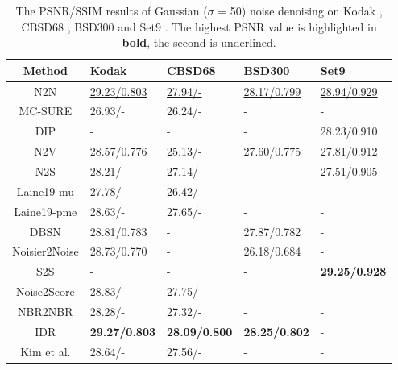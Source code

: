 \documentclass[conference]{IEEEtran}
\begin{document}
\begin{table}[t]
	\setlength{\abovecaptionskip}{0pt}
	\setlength{\belowcaptionskip}{0pt}
	\caption{The PSNR/SSIM results of Gaussian ($\sigma$ = 50) noise denoising on Kodak \cite{franzen1999kodak}, CBSD68 \cite{roth2005fields}, BSD300 \cite{martin2001database} and Set9 \cite{ulyanov2018deep}. The highest PSNR value is highlighted in \textbf {bold}, the second is \underline{underlined}.}
	\centering
	\begin{tabular*}{\hsize}{c@{\extracolsep{\fill}}l@{\extracolsep{\fill}}l@{\extracolsep{\fill}}l@{\extracolsep{\fill}}l@{\extracolsep{\fill}}}
		\hline
		Method	&Kodak&	CBSD68&	BSD300&	Set9\\
		\hline
		N2N \cite{lehtinen2018noise2noise}	&\underline{29.23/0.803}&	\underline{27.94/-}&	\underline{28.17/0.799}&	\underline{28.94/0.929}\\
		MC-SURE\cite{ramani2008monte}	&26.93/-&	26.24/-&	-&	-\\
		DIP \cite{ulyanov2018deep}&	-&	-&	-	&28.23/0.910\\
		N2V \cite{krull2019noise2void}	&28.57/0.776&	25.13/-&	27.60/0.775&	27.81/0.912\\
		N2S \cite{batson2019noise2self}&	28.21/-	&27.14/-	&-	&27.51/0.905\\
		Laine19-mu \cite{laine2019high}&	27.78/-&	26.42/-&	-&	-\\
		Laine19-pme \cite{laine2019high}	&28.63/-&	27.65/-	&-	&-\\
		DBSN \cite{wu2020unpaired}	&28.81/0.783	&-	&27.87/0.782	&-\\
		Noisier2Noise \cite{moran2020noisier2noise}&	28.73/0.770&	-&	26.18/0.684	&-\\
		S2S \cite{quan2020self2self}	&-	&-	&-	&{\bf 29.25/0.928}\\
		Noise2Score \cite{kim2021noise2score}&	28.83/-	&27.75/-&	-&	-\\
		NBR2NBR \cite{huang2021neighbor2neighbor}	&28.28/-	&27.32/-	&-&	-\\
		IDR \cite{zhang2022idr}	&{\bf 29.27/0.803}&	{\bf 28.09/0.800}& {\bf 28.25/0.802} &-\\
		Kim et al. \cite{kim2022noise}	&28.64/-&	27.56/-	&-&	-\\
		\hline
	\end{tabular*}
	\setlength{\belowcaptionskip}{-0.5cm}
	\label{tab:color_g_50}
\vspace{-1em}
\end{table}
\end{document}
